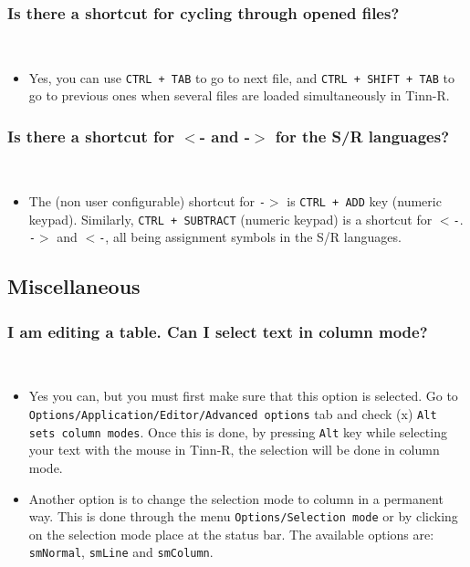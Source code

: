 \subsubsection{Is there a shortcut for cycling through opened files?}\\

\begin{itemize}
  \item Yes, you can use \texttt{CTRL + TAB} to go to next file, and
    \texttt{CTRL + SHIFT + TAB} to go to previous ones when several
    files are loaded simultaneously in Tinn-R.
\end{itemize}


\subsubsection{Is there a shortcut for $<$- and -$>$ for the S/R languages?}\\

\begin{itemize}
  \item The (non user configurable) shortcut for \texttt{-$>$} is
    \texttt{CTRL + ADD} key (numeric keypad). Similarly,
    \texttt{CTRL + SUBTRACT} (numeric keypad) is a shortcut for
    \texttt{$<$-}. \texttt{-$>$} and \texttt{$<$-}, all being
    assignment symbols in the S/R languages.
\end{itemize}


\subsection{Miscellaneous}

\subsubsection{I am editing a table. Can I select text in column mode?}\\

\begin{itemize}
  \item Yes you can, but you must first make sure that this option is selected.
    Go to \texttt{Options/Application/Editor/Advanced options} tab and check (x)
    \texttt{Alt sets column modes}. Once this is done, by pressing
    \texttt{Alt} key while selecting your text with the mouse in Tinn-R,
    the  selection will be done in column mode.
  \item Another option is to change the selection mode to column in a permanent
    way. This is done through the menu \texttt{Options/Selection mode} or by
    clicking on the selection mode place at the status bar. The available
    options are: \texttt{smNormal}, \texttt{smLine} and \texttt{smColumn}.
\end{itemize}


